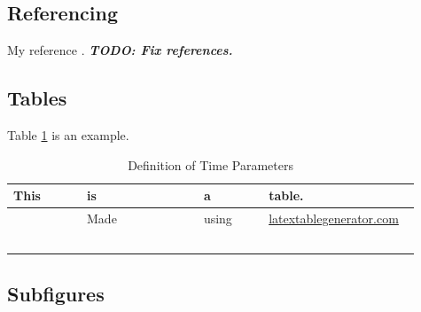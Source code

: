 \documentclass{article}
\newcommand{\notetoself}[1]{\color{red}\Large{\textbf{\textit{TODO: #1}}}\normalsize\color{black}}
\begin{document}
\subsection{Referencing}
My reference  \cite{akce2010remote}.
\notetoself{Fix references.}


\subsection{Tables}
Table \ref{Table} is an example.

\begin{table}[H]
	\centering
	\raggedright
	\begin{tabular}{ | p{0.17\linewidth} |
			p{0.275\linewidth} |
			p{0.15\linewidth} |
			p{0.35\linewidth} | } 
		\hline
		\textbf{This} & \textbf{is} & \textbf{a}   & \textbf{table.}    \\ \hline
		&Made&using&\url{latextablegenerator.com} \\ \hline
		&&& \\ \hline
		&&& \\ \hline
		&&& \\ \hline
		&&& \\ \hline
		&&& \\ \hline
	\end{tabular}
	\caption{Definition of Time Parameters}
	\label{Table}
\end{table}



\subsection{Subfigures}
\end{document}
